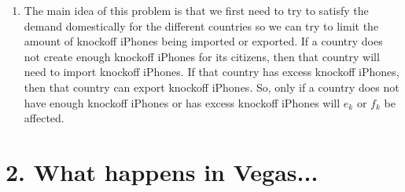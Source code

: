 \documentclass[11pt]{article}
\begin{document}
\begin{enumerate}[label=(\alph*)]
\item
The main idea of this problem is that we first need to try to satisfy the demand domestically for the different countries so we can try to limit the amount of knockoff iPhones being imported or exported. If a country does not create enough knockoff iPhones for its citizens, then that country will need to import knockoff iPhones. If that country has excess knockoff iPhones, then that country can export knockoff iPhones. So, only if a country does not have enough knockoff iPhones or has excess knockoff iPhones will $e_k$ or $f_k$ be affected.
\end{enumerate}



\newpage
\section*{2. What happens in Vegas...}
\end{document}
